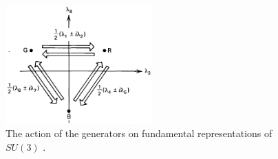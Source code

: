 \begin{figure}[h!]
 \begin{center}
\includegraphics[width=0.5\textwidth]{figures/theory/SU3.png}
\caption{The action of the generators on fundamental representations of $SU(3)$ \cite{Quark_Lepton}.}
  \label{fig:SU3}
 \end{center}
\end{figure}
